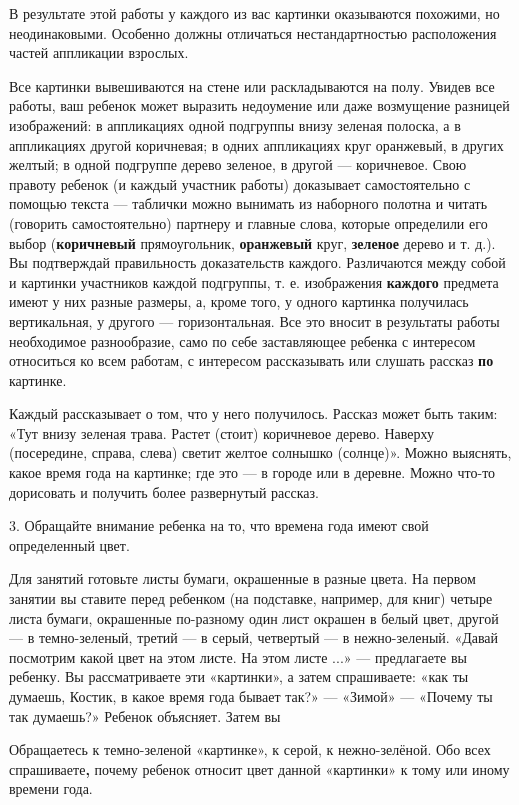 \documentclass[a5paper]{book}
\begin{document}
В результате этой работы у каждого из вас картинки оказываются похожими,
но неодинаковыми. Особенно должны отличаться нестандартностью
расположения частей аппликации взрослых.

Все картинки вывешиваются на стене или раскладываются на полу. Увидев
все работы, ваш ребенок может выразить недоумение или даже возмущение
разницей изображений: в аппликациях одной подгруппы внизу зеленая
полоска, а в аппликациях другой коричневая; в одних аппликациях круг
оранжевый, в других желтый; в одной подгруппе дерево зеленое, в другой
--- коричневое. Свою правоту ребенок (и каждый участник работы)
доказывает самостоятельно с помощью текста --- таблички можно вынимать
из наборного полотна и читать (говорить самостоятельно) партнеру и
главные слова, которые определили его выбор (\textbf{коричневый}
прямоугольник, \textbf{оранжевый} круг, \textbf{зеленое} дерево и т.
д.). Вы подтверждай правильность доказательств каждого. Различаются
между собой и картинки участников каждой подгруппы, т. е. изображения
\textbf{каждого} предмета имеют у них разные размеры, а, кроме того, у
одного картинка получилась вертикальная, у другого --- горизонтальная.
Все это вносит в результаты работы необходимое разнообразие, само по
себе заставляющее ребенка с интересом относиться ко всем работам, с
интересом рассказывать или слушать рассказ \textbf{по} картинке.

Каждый рассказывает о том, что у него получилось. Рассказ может быть
таким: «Тут внизу зеленая трава. Растет (стоит) коричневое дерево.
Наверху (посередине, справа, слева) светит желтое солнышко (солнце)».
Можно выяснять, какое время года на картинке; где это --- в городе или в
деревне. Можно что-то дорисовать и получить более развернутый рассказ.

3. Обращайте внимание ребенка на то, что времена года имеют свой
определенный цвет.

Для занятий готовьте листы бумаги, окрашенные в разные цвета. На первом
занятии вы ставите перед ребенком (на подставке, например, для книг)
четыре листа бумаги, окрашенные по-разному один лист окрашен в белый
цвет, другой --- в темно-зеленый, третий --- в серый, четвертый --- в
нежно-зеленый. «Давай посмотрим какой цвет на этом листе. На этом листе
...» --- предлагаете вы ребенку. Вы рассматриваете эти «картинки», а
затем спрашиваете: «как ты думаешь, Костик, в какое время года бывает
так?» --- «Зимой» --- «Почему ты так думаешь?» Ребенок объясняет. Затем
вы

Обращаетесь к темно-зеленой «картинке», к серой, к нежно-зелёной. Обо
всех спрашиваете\textbf{,} почему ребенок относит цвет данной «картинки»
к тому или иному времени года.
\end{document}
